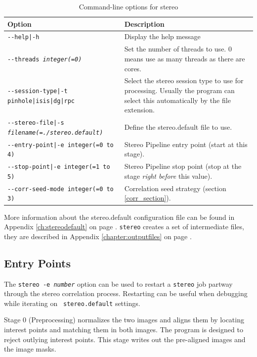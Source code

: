 \begin{longtable}{|l|p{7.5cm}|}
\caption{Command-line options for stereo}
\label{tbl:stereo}
\endfirsthead
\endhead
\endfoot
\endlastfoot
\hline
Option & Description \\ \hline \hline
\texttt{-\/-help|-h} & Display the help message\\ \hline
\texttt{-\/-threads \textit{integer(=0)}} & Set the number of threads to use. 0 means use as many threads as there are cores.\\ \hline
\texttt{-\/-session-type|-t pinhole|isis|dg|rpc} & Select the stereo session type to use for processing. Usually the program can select this automatically by the file extension.\\ \hline
\texttt{-\/-stereo-file|-s \textit{filename(=./stereo.default)}} & Define the stereo.default file to use.\\ \hline
\texttt{-\/-entry-point|-e integer(=0 to 4)} & Stereo Pipeline entry
point (start at this stage). \\ \hline
\texttt{-\/-stop-point|-e integer(=1 to 5)} & Stereo Pipeline stop point (stop at the stage {\it right before} this value). \\ \hline
\texttt{-\/-corr-seed-mode integer(=0 to 3)} & Correlation seed strategy (section \ref{corr_section}). \\ \hline
\end{longtable}

More information about the stereo.default configuration file can be
found in Appendix \ref{ch:stereodefault} on page
\pageref{ch:stereodefault}.  \texttt{stereo} creates a set
of intermediate files, they are described in Appendix
\ref{chapter:outputfiles} on page \pageref{chapter:outputfiles}.

\subsection{Entry Points}
\label{entrypoints}

The \texttt{stereo -e \textit{number}} option can be used to restart
a {\tt stereo} job partway through the stereo correlation process.
Restarting can be useful when debugging while iterating on {\tt
stereo.default} settings.

Stage 0 (Preprocessing) normalizes the two images and aligns them
by locating interest points and matching them in both images. The
program is designed to reject outlying interest points.  This stage
writes out the pre-aligned images and the image masks.

